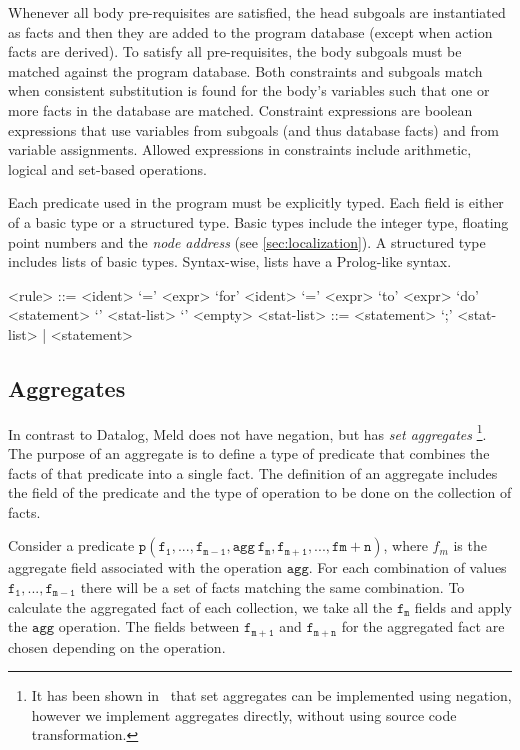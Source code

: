 \documentclass[preprint]{sigplanconf}
\begin{document}
Whenever all body pre-requisites are satisfied, the head subgoals are instantiated as
facts and then they are added to the program database (except when action facts are derived).
To satisfy all pre-requisites, the body
subgoals must be matched against the program database. Both constraints and subgoals
match when consistent substitution is found for the body's variables such that one or
more facts in the database are matched. Constraint expressions are boolean expressions that
use variables from subgoals (and thus database facts) and from variable assignments. Allowed
expressions in constraints include arithmetic, logical and set-based operations.

Each predicate used in the program must be explicitly typed. Each field is either of a basic
type or a structured type. Basic types include the integer type, floating point numbers and
the \emph{node address} (see \ref{sec:localization}).
A structured type includes lists of basic types. Syntax-wise, lists have a Prolog-like syntax.

\begin{grammar}
<rule> ::= <ident> ‘=’ <expr>
\alt ‘for’ <ident> ‘=’ <expr> ‘to’ <expr> ‘do’ <statement>
\alt ‘{’ <stat-list> ‘}’
\alt <empty>
<stat-list> ::= <statement> ‘;’ <stat-list> | <statement>
\end{grammar}

\subsection{Aggregates}

In contrast to Datalog, Meld does not have negation, but has \emph{set aggregates}
\footnote{It has been shown in~\cite{zaniolo-arni-ong-dood93} that set aggregates can be
implemented using negation, however we implement aggregates directly, without using source
code transformation.}. The purpose of an aggregate is to define a type of predicate that combines
the facts of that predicate into a single fact. The definition of an aggregate includes the
field of the predicate and the type of operation to be done on the collection of facts.

Consider a predicate $\mathtt{p(f_1, ..., f_{m-1}, agg\ f_{m}, f_{m+1}, ..., f{m+n})}$,
where $f_m$ is the aggregate field associated with the operation $\mathtt{agg}$. For each
combination of values $\mathtt{f_1, ..., f_{m-1}}$ there will be a set of facts matching
the same combination. To calculate the aggregated fact of each collection, we take all
the $\mathtt{f_{m}}$ fields and apply the $\mathtt{agg}$ operation. The fields between
$\mathtt{f_{m+1}}$ and $\mathtt{f_{m+n}}$ for the aggregated fact are chosen depending
on the operation.
\end{document}
